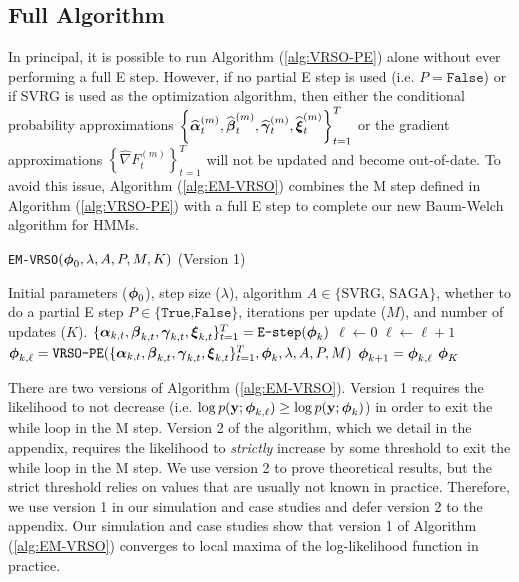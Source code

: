 \subsection{Full Algorithm}

In principal, it is possible to run Algorithm (\ref{alg:VRSO-PE}) alone without ever performing a full E step. However, if no partial E step is used (i.e. $P = \texttt{False}$) or if SVRG is used as the optimization algorithm, then either the conditional probability approximations $\left\{\widehat {\boldsymbol{\alpha}}_t^{(m)}, \widehat {\boldsymbol{\beta}}_t^{(m)}, \widehat {\boldsymbol{\gamma}}_t^{(m)}, \widehat {\boldsymbol{\xi}}_t^{(m)} \right\}_{t=1}^T$ or the gradient approximations $\left\{\widehat \nabla F_{t}^{(m)} \right\}_{t=1}^T$ will not be updated and become out-of-date. To avoid this issue, Algorithm (\ref{alg:EM-VRSO}) combines the M step defined in Algorithm (\ref{alg:VRSO-PE}) with a full E step to complete our new Baum-Welch algorithm for HMMs.

\begin{algorithm}
\caption{\texttt{EM-VRSO}$(\boldsymbol{\phi}_0,\lambda, A, P, M, K)$ (Version 1)}\label{alg:EM-VRSO}
\begin{algorithmic}[1]
\Require Initial parameters ($\boldsymbol{\phi}_{0}$), step size ($\lambda$), algorithm $A \in \{\text{SVRG, SAGA}\}$, whether to do a partial E step $P \in \{\texttt{True,False}\}$, iterations per update ($M$), and number of updates ($K$).
%
\vspace{5pt}
\vspace{5pt}
% 
\State $\{\boldsymbol{\alpha}_{k,t}, \boldsymbol{\beta}_{k,t}, \boldsymbol{\gamma}_{k,t}, \boldsymbol{\xi}_{k,t}\}_{t=1}^T = \texttt{E-step}(\boldsymbol{\phi}_{k})$ 
%
\vspace{5pt}
%
\State $\ell \gets 0$ 
%
%
\State $\ell \gets \ell+1$
\State $\boldsymbol{\phi}_{k,\ell} = \texttt{VRSO-PE}(\{\boldsymbol{\alpha}_{k,t}, \boldsymbol{\beta}_{k,t}, \boldsymbol{\gamma}_{k,t}, \boldsymbol{\xi}_{k,t}\}_{t=1}^T,\boldsymbol{\phi}_k,\lambda,A,P,M)$
%
\EndWhile
\State $\boldsymbol{\phi}_{k+1} = \boldsymbol{\phi}_{k,\ell}$
\EndFor
\State \Return $\boldsymbol{\phi}_K$
\end{algorithmic}
\end{algorithm}

There are two versions of Algorithm (\ref{alg:EM-VRSO}). Version 1 requires the likelihood to not decrease (i.e. $\log p(\mathbf{y};\boldsymbol{\phi}_{k,\ell}) \geq \log p(\mathbf{y};\boldsymbol{\phi}_{k})$) in order to exit the while loop in the M step. Version 2 of the algorithm, which we detail in the appendix, requires the likelihood to \textit{strictly} increase by some threshold to exit the while loop in the M step. We use version 2 to prove theoretical results, but the strict threshold relies on values that are usually not known in practice. Therefore, we use version 1 in our simulation and case studies and defer version 2 to the appendix. Our simulation and case studies show that version 1 of Algorithm (\ref{alg:EM-VRSO}) converges to local maxima of the log-likelihood function in practice. 

